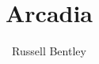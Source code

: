 \documentclass[10pt]{article}
\title{Arcadia}
\author{Russell Bentley}
\begin{document}
\maketitle

\tableofcontents

\twocolumn












\printbibliography
\end{document}
